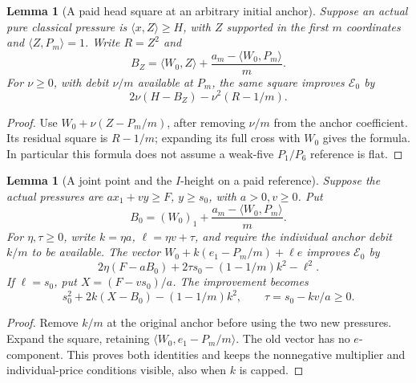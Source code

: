 \documentclass[11pt]{article}
\newtheorem{lemma}[theorem]{Lemma}
\theoremstyle{definition}
\theoremstyle{remark}
\newcommand{\ip}[2]{\langle #1,#2\rangle}
\begin{document}
\begin{lemma}[A paid head square at an arbitrary initial anchor]
\label{lem:I-head-paid-square}
Suppose an actual pure classical pressure is
\(\ip xZ\ge H\), with \(Z\) supported in the first \(m\) coordinates
and \(\ip Z{P_m}=1\). Write \(R=Z^2\) and
\[
 B_Z=\ip{W_0}Z+{\frac{a_m-\ip{W_0}{P_m}}{ m}}.
\]
For \(\nu\ge0\), with debit \(\nu/m\) available at \(P_m\), the
same square improves \(\mathcal E_0\) by
\[
 2\nu(H-B_Z)-\nu^2(R-1/m).
\]
\end{lemma}
\begin{proof}
Use \(W_0+\nu(Z-P_m/m)\), after removing \(\nu/m\) from the
anchor coefficient. Its residual square is \(R-1/m\); expanding its
full cross with \(W_0\) gives the formula. In particular this formula
does not assume a weak-five \(P_1/P_6\) reference is flat.
\end{proof}

\begin{lemma}[A joint point and the \(I\)-height on a paid reference]
\label{lem:I-joint-paid-reference}
Suppose the actual pressures are \(a x_1+v y\ge F\), \(y\ge s_0\),
with \(a>0,v\ge0\). Put
\[
 B_0=(W_0)_1+{\frac{a_m-\ip{W_0}{P_m}}{ m}}.
\]
For \(\eta,\tau\ge0\), write \(k=\eta a\), \(\ell=\eta v+\tau\),
and require the individual anchor debit \(k/m\) to be available.
The vector
\(W_0+k(e_1-P_m/m)+\ell e\) improves \(\mathcal E_0\) by
\[
 2\eta(F-aB_0)+2\tau s_0-(1-1/m)k^2-\ell^2.
\]
If \(\ell=s_0\), put \(X=(F-vs_0)/a\). The improvement becomes
\[
 s_0^2+2k(X-B_0)-(1-1/m)k^2,
 \qquad \tau=s_0-kv/a\ge0.
\]
\end{lemma}
\begin{proof}
Remove \(k/m\) at the original anchor before using the two new
pressures. Expand the square, retaining
\(\ip{W_0}{e_1-P_m/m}\). The old vector has no \(e\)-component.
This proves both identities and keeps the nonnegative multiplier and
individual-price conditions visible, also when \(k\) is capped.
\end{proof}
\end{document}
